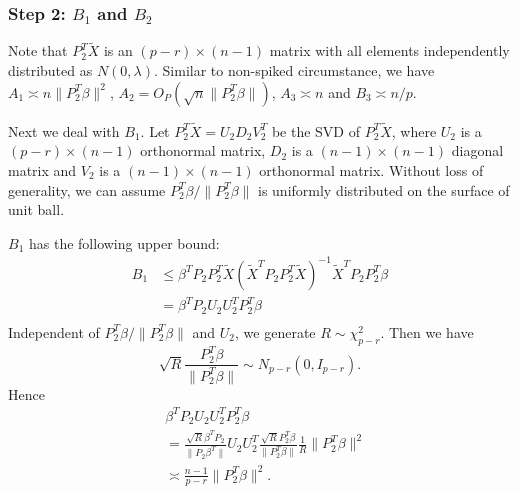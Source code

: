 \documentclass[review]{elsarticle}
\theoremstyle{plain}
\theoremstyle{definition}
\theoremstyle{remark}
\begin{document}
\subsubsection{Step 2: $B_1$ and $B_2$}

Note that $P_2^T \tilde{X}$ is an $(p-r)\times (n-1)$ matrix with all elements independently distributed as $N(0,\lambda)$. Similar to non-spiked circumstance, we have $A_1\asymp n\|P_2^T\beta\|^2$, $A_2=O_P(\sqrt{n}\|P_2^T \beta\|)$, $A_3\asymp n$ and $B_3\asymp n/p$.

Next we deal with $B_1$.
Let $P_2^T \tilde{X}=U_2 D_2 V_2^T$ be the SVD of $P_2^T \tilde{X}$, where $U_2$ is a $(p-r)\times (n-1)$ orthonormal matrix, $D_2$ is a $(n-1)\times(n-1)$ diagonal matrix and $V_2$ is a $(n-1)\times (n-1)$ orthonormal matrix. Without loss of generality, we can assume $P_2^T \beta/\|P_2^T\beta\|$ is uniformly distributed on the surface of unit ball.

$B_1$ has the following upper bound:
\begin{equation}\label{upperbound}
    \begin{aligned}
        B_1&\leq \beta^T P_2 P_2^T \tilde{X} {(\tilde{X}^T P_2 P_2^T \tilde{X})}^{-1}\tilde{X}^T P_2 P_2^T \beta\\
        &=\beta^T P_2 U_2 U_2^T P_2^T \beta\\
    \end{aligned}
\end{equation}
Independent of $P_2^T\beta/\|P_2^T \beta\|$ and $U_2$, we generate $R\sim \chi^2_{p-r}$. Then we have
\begin{equation}
    \sqrt{R}\frac{P_2^T \beta}{\|P_2^T \beta\|} \sim N_{p-r}(0,I_{p-r}).
\end{equation}
Hence
\begin{equation}
    \begin{aligned}
        &\beta^T P_2 U_2 U_2^T P_2^T \beta\\
        &=\frac{\sqrt{R}\beta^T P_2}{\|P_2 \beta^T\|} U_2 U_2^T \frac{\sqrt{R}P_2^T \beta}{\|P_2^T \beta\|}\frac{1}{R}\|P_2^T \beta\|^2\\
        &\asymp \frac{n-1}{p-r}\|P_2^T\beta\|^2.
    \end{aligned}
\end{equation}
\end{document}
